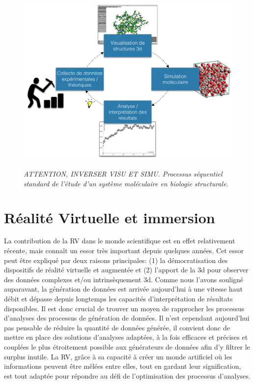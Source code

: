 \begin{figure}
  \centering
  {\includegraphics[width=.75\linewidth]{./figures/ch2/ch2_structural_biology_process}}
    \caption{{\it ATTENTION, INVERSER VISU ET SIMU.
    Processus séquentiel standard de l'étude d'un système moléculaire en biologie structurale.}}
  \label{Fig:schema_seq_bio_struct}
  \hspace{0.3cm}
\end{figure}


\section{Réalité Virtuelle et immersion} \label{RV_science}

La contribution de la RV dans le monde scientifique est en effet relativement récente, mais connaît un essor très important depuis quelques années. Cet essor peut être expliqué par deux raisons principales: (1) la démocratisation des dispositifs de réalité virtuelle et augmentée et (2) l'apport de la 3d pour observer des données complexes et/ou intrinsèquement 3d. 
Comme nous l'avons souligné auparavant, la génération de données est arrivée aujourd'hui à une vitesse haut débit et dépasse depuis longtemps les capacités d'interprétation de résultats disponibles. Il est donc crucial de trouver un moyen de rapprocher les processus d'analyses des processus de génération de données. Il n'est cependant aujourd'hui pas pensable de réduire la quantité de données générée, il convient donc de mettre en place des solutions d'analyses adaptées, à la fois efficaces et précises et couplées le plus étroitement possible aux générateurs de données afin d'y filtrer le surplus inutile. La RV, grâce à sa capacité à créer un monde artificiel où les informations peuvent être mêlées entre elles, tout en gardant leur signification, est tout adaptée pour répondre au défi de l'optimisation des processus d'analyses.

